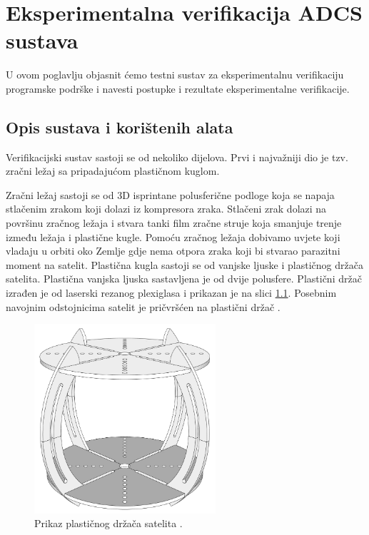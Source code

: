 \documentclass[times, utf8, diplomski, numeric]{templates/template}
\begin{document}
\chapter{Eksperimentalna verifikacija ADCS sustava}{
    U ovom poglavlju objasnit ćemo testni sustav za eksperimentalnu verifikaciju programske podrške i navesti postupke i rezultate eksperimentalne verifikacije. 

    \section{Opis sustava i korištenih alata}{
    \label{section:opis_sustava_i_koristenih_alata}
        Verifikacijski sustav sastoji se od nekoliko dijelova. Prvi i najvažniji dio je tzv. zračni ležaj sa pripadajućom plastičnom kuglom.

        Zračni ležaj sastoji se od 3D isprintane polusferične podloge koja se napaja stlačenim zrakom koji dolazi iz kompresora zraka. Stlačeni zrak dolazi na površinu zračnog ležaja i stvara tanki film zračne struje koja smanjuje trenje između ležaja i plastične kugle. Pomoću zračnog ležaja dobivamo uvjete koji vladaju u orbiti oko Zemlje gdje nema otpora zraka koji bi stvarao parazitni moment na satelit. Plastična kugla sastoji se od vanjske ljuske i plastičnog držača satelita. Plastična vanjska ljuska sastavljena je od dvije polusfere. Plastični držač izrađen je od laserski rezanog plexiglasa i prikazan je na slici \ref{fig:drzac}. Posebnim navojnim odstojnicima satelit je pričvršćen na plastični držač \cite{zracni_lezaj}.

        \begin{figure}[h!]
        \centering
        \includegraphics[width=0.6\textwidth]{images/drzac.png}
        \caption{Prikaz plastičnog držača satelita \cite{zracni_lezaj}.}
        \label{fig:drzac}
        \end{figure}

}}
\end{document}
